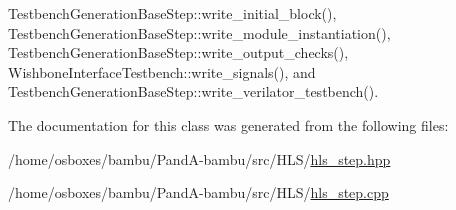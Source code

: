 Testbench\+Generation\+Base\+Step\+::write\+\_\+initial\+\_\+block(), Testbench\+Generation\+Base\+Step\+::write\+\_\+module\+\_\+instantiation(), Testbench\+Generation\+Base\+Step\+::write\+\_\+output\+\_\+checks(), Wishbone\+Interface\+Testbench\+::write\+\_\+signals(), and Testbench\+Generation\+Base\+Step\+::write\+\_\+verilator\+\_\+testbench().



The documentation for this class was generated from the following files\+:\begin{DoxyCompactItemize}
\item 
/home/osboxes/bambu/\+Pand\+A-\/bambu/src/\+H\+L\+S/\hyperlink{hls__step_8hpp}{hls\+\_\+step.\+hpp}\item 
/home/osboxes/bambu/\+Pand\+A-\/bambu/src/\+H\+L\+S/\hyperlink{hls__step_8cpp}{hls\+\_\+step.\+cpp}\end{DoxyCompactItemize}
